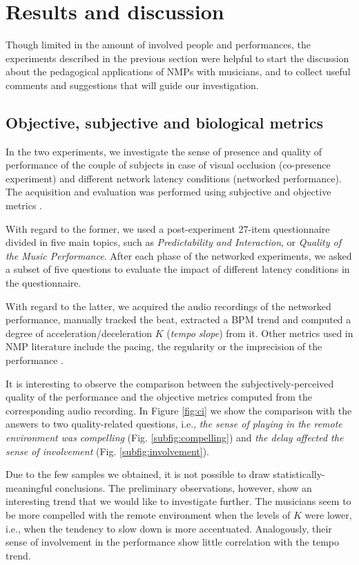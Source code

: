 \section{Results and discussion}\label{sec:discussion}
Though limited in the amount of involved people and performances, the experiments described in the previous section were helpful to start the discussion about the pedagogical applications of NMPs with musicians, and to collect useful comments and suggestions that will guide our investigation. 


\subsection{Objective, subjective and biological metrics}\label{subsec:metrics}
In the two experiments, we investigate the sense of presence and quality of performance of the couple of subjects in case of visual occlusion (co-presence experiment) and different network latency conditions (networked performance). The acquisition and evaluation was performed using subjective and objective metrics \cite{CIM2018}. 

With regard to the former, we used a post-experiment 27-item questionnaire divided in five main topics, such as \textit{Predictability and Interaction}, or \textit{Quality of the Music Performance}. After each phase of the networked experiments, we asked a subset of five questions to evaluate the impact of different latency conditions in the questionnaire.

With regard to the latter, we acquired the audio recordings of the networked performance, manually tracked the beat, extracted a BPM trend and computed a degree of acceleration/deceleration $K$  (\textit{tempo slope}) from it. Other metrics used in NMP literature include the pacing, the regularity or the imprecision of the performance \cite{RottondiOverview}.

It is interesting to observe the comparison between the subjectively-perceived quality of the performance and the  objective metrics computed from the corresponding audio recording. In Figure \ref{fig:ci} we show the comparison with the answers to two quality-related questions, i.e., \textit{the sense of playing in the remote environment was compelling} (Fig. \ref{subfig:compelling}) and \textit{the delay affected the sense of involvement} (Fig. \ref{subfig:involvement}).

Due to the few samples we obtained, it is not possible to draw statistically-meaningful conclusions. The preliminary observations, however, show an interesting trend that we would like to investigate further. The musicians seem to be more compelled with the remote environment when the levels of $K$ were lower, i.e., when the tendency to slow down is more accentuated. Analogously, their sense of involvement in the performance show little correlation with the tempo trend. 

